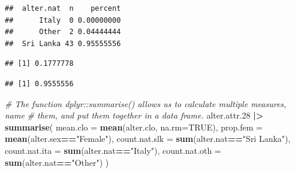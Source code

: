 \documentclass[
]{book}
\newenvironment{Shaded}{\begin{snugshade}}{\end{snugshade}}
\newcommand{\AttributeTok}[1]{\textcolor[rgb]{0.13,0.29,0.53}{#1}}
\newcommand{\CommentTok}[1]{\textcolor[rgb]{0.56,0.35,0.01}{\textit{#1}}}
\newcommand{\ConstantTok}[1]{\textcolor[rgb]{0.56,0.35,0.01}{#1}}
\newcommand{\FloatTok}[1]{\textcolor[rgb]{0.00,0.00,0.81}{#1}}
\newcommand{\FunctionTok}[1]{\textcolor[rgb]{0.13,0.29,0.53}{\textbf{#1}}}
\newcommand{\NormalTok}[1]{#1}
\newcommand{\SpecialCharTok}[1]{\textcolor[rgb]{0.81,0.36,0.00}{\textbf{#1}}}
\newcommand{\StringTok}[1]{\textcolor[rgb]{0.31,0.60,0.02}{#1}}
\begin{document}
\begin{verbatim}
##  alter.nat  n    percent
##      Italy  0 0.00000000
##      Other  2 0.04444444
##  Sri Lanka 43 0.95555556
\end{verbatim}

\begin{Shaded}
\end{Shaded}

\begin{verbatim}
## [1] 0.1777778
\end{verbatim}

\begin{Shaded}
\end{Shaded}

\begin{verbatim}
## [1] 0.9555556
\end{verbatim}

\begin{Shaded}
\begin{Highlighting}[]
\CommentTok{\# The function dplyr::summarise() allows us to calculate multiple measures, name}
\CommentTok{\# them, and put them together in a data frame.}
\NormalTok{alter.attr}\FloatTok{.28} \SpecialCharTok{|\textgreater{}}
  \FunctionTok{summarise}\NormalTok{(}
    \AttributeTok{mean.clo =} \FunctionTok{mean}\NormalTok{(alter.clo, }\AttributeTok{na.rm=}\ConstantTok{TRUE}\NormalTok{), }
    \AttributeTok{prop.fem =} \FunctionTok{mean}\NormalTok{(alter.sex}\SpecialCharTok{==}\StringTok{"Female"}\NormalTok{), }
    \AttributeTok{count.nat.slk =} \FunctionTok{sum}\NormalTok{(alter.nat}\SpecialCharTok{==}\StringTok{"Sri Lanka"}\NormalTok{), }
    \AttributeTok{count.nat.ita =} \FunctionTok{sum}\NormalTok{(alter.nat}\SpecialCharTok{==}\StringTok{"Italy"}\NormalTok{), }
    \AttributeTok{count.nat.oth =} \FunctionTok{sum}\NormalTok{(alter.nat}\SpecialCharTok{==}\StringTok{"Other"}\NormalTok{)}
\NormalTok{  )}
\end{Highlighting}
\end{Shaded}
\end{document}
